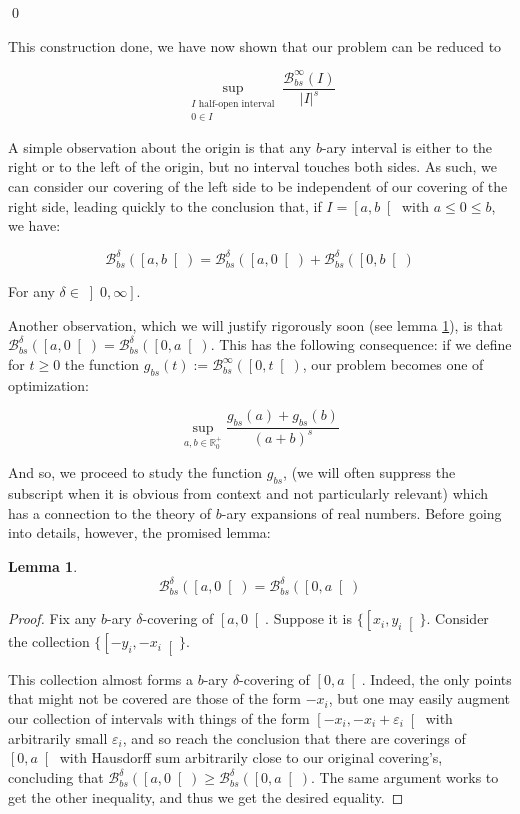 \documentclass[11pt]{amsart}
\newcommand{\R}{\mathbb{R}}
\newcommand{\BB}{\mathcal{B}}
\newtheorem{lemma}{Lemma}
\begin{document}
\qed

This construction done, we have now shown that our problem can be reduced to


\[\sup_{\substack{\text{$I$ half-open interval}\\ 0 \in I}} \frac{\BB_{bs}^\infty(I)}{\lvert I \rvert^s}\]

A simple observation about the origin is that any $b$-ary interval is either to the right or to the left of the origin, but no interval touches both sides. As such, we can consider our covering of the left side to be independent of our covering of the right side, leading quickly to the conclusion that, if $I = \left[ a, b \right[$ with $a \leq 0 \leq b$, we have:

\[\BB_{bs}^\delta(\left[a, b\right[) = \BB_{bs}^\delta(\left[a, 0\right[) + \BB_{bs}^\delta(\left[0, b\right[)\]

For any $\delta \in \left]0, \infty \right]$.

Another observation, which we will justify rigorously soon (see lemma \ref{sidedoesntmatter}), is that $\BB_{bs}^\delta(\left[a, 0\right[) = \BB_{bs}^\delta(\left[0, a\right[)$. This has the following consequence: if we define for $t \geq 0$ the function $g_{bs}(t) := \BB_{bs}^\infty(\left[0, t \right[)$, our problem becomes one of optimization:

\[ \sup_{a,b \in \R^+_0} \frac{g_{bs}(a) + g_{bs}(b)}{(a + b)^s} \]

And so, we proceed to study the function $g_{bs}$, (we will often suppress the subscript when it is obvious from context and not particularly relevant) which has a connection to the theory of $b$-ary expansions of real numbers. Before going into details, however, the promised lemma:

\begin{lemma} \label{sidedoesntmatter}
\[\BB_{bs}^\delta(\left[a, 0\right[) = \BB_{bs}^\delta(\left[0, a\right[)\]
\end{lemma}

\begin{proof}
Fix any $b$-ary $\delta$-covering of $\left[a, 0\right[$. Suppose it is $\{\left[x_i, y_i\right[\}$. Consider the collection $\{\left[-y_i, -x_i\right[\}$. 

This collection almost forms a $b$-ary $\delta$-covering of $\left[0, a\right[$. Indeed, the only points that might not be covered are those of the form $-x_i$, but one may easily augment our collection of intervals with things of the form $\left[ -x_i, -x_i + \varepsilon_i \right[$ with arbitrarily small $\varepsilon_i$, and so reach the conclusion that there are coverings of $\left[0, a\right[$ with Hausdorff sum arbitrarily close to our original covering's, concluding that $\BB_{bs}^\delta(\left[a, 0\right[) \geq \BB_{bs}^\delta(\left[0, a\right[)$. The same argument works to get the other inequality, and thus we get the desired equality.
\end{proof}
\end{document}
